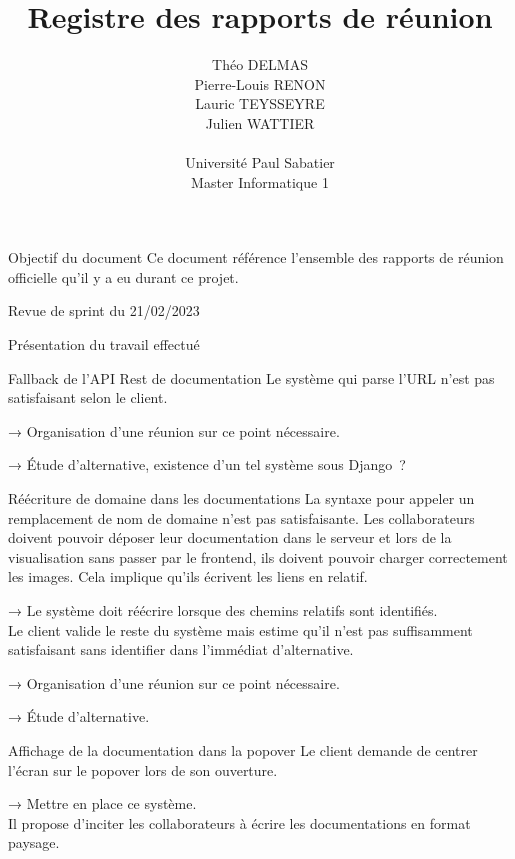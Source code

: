 \documentclass[]{article}
\title{Registre des rapports de réunion}
\author{
    Théo DELMAS\\
    Pierre-Louis RENON\\
    Lauric TEYSSEYRE\\
    Julien WATTIER\\
    \\
    Université Paul Sabatier\\
    Master Informatique 1\\
   }
\begin{document}
\maketitle
\newpage
\tableofcontents
\newpage

\begin{section}{Objectif du document}
 Ce document référence l'ensemble des rapports de réunion officielle qu'il y a eu durant ce projet.
\end{section}

{
\setlength{\parindent}{0pt} %
\begin{section}{Revue de sprint du 21/02/2023}
 \begin{subsection}{Présentation du travail effectué}
     \begin{subsubsection}{Fallback de l’API Rest de documentation}
         Le système qui parse l'URL n’est pas satisfaisant selon le client.

         → Organisation d’une réunion sur ce point nécessaire.

         → Étude d’alternative, existence d’un tel système sous Django ?
     \end{subsubsection}

     \begin{subsubsection}{Réécriture de domaine dans les documentations}
         La syntaxe pour appeler un remplacement de nom de domaine n’est pas satisfaisante. Les collaborateurs doivent pouvoir déposer leur documentation dans le serveur et lors de la visualisation sans passer par le frontend, ils doivent pouvoir charger correctement les images. Cela implique qu’ils écrivent les liens en relatif.

         → Le système doit réécrire lorsque des chemins relatifs sont identifiés.
         \\[5mm]
         Le client valide le reste du système mais estime qu’il n’est pas suffisamment satisfaisant sans identifier dans l’immédiat d’alternative.

         → Organisation d’une réunion sur ce point nécessaire.

         → Étude d’alternative.
     \end{subsubsection}

     \begin{subsubsection}{Affichage de la documentation dans la popover}
         Le client demande de centrer l’écran sur le popover lors de son ouverture.

         → Mettre en place ce système.
         \\[5mm]
         Il propose d’inciter les collaborateurs à écrire les documentations en format paysage.


\end{subsubsection}
\end{subsection}
\end{section}}
\end{document}
